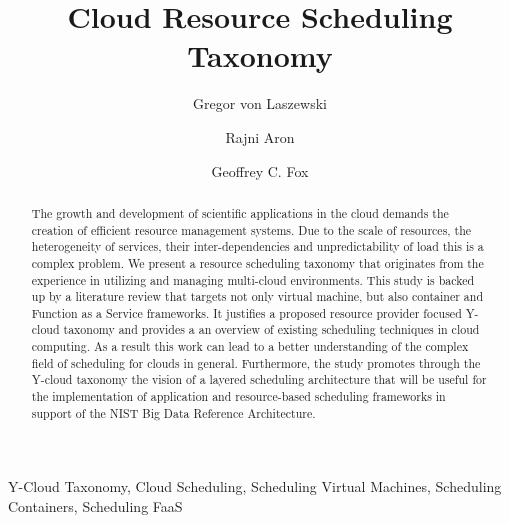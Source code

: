 \documentclass[final,5p,times,twocolumn]{elsarticle}
\author[label1]{Gregor von Laszewski\corref{cor1}\fnref{label3}}
\author[label2]{Rajni Aron}
\author[label1]{Geoffrey C. Fox}
\newcommand{\TITLE}{Cloud Resource Scheduling Taxonomy }
\begin{document}
\onecolumn







\begin{frontmatter}
\title{\TITLE}

\maketitle



\begin{keyword}

  Y-Cloud Taxonomy,
  Cloud Scheduling,
  Scheduling Virtual Machines,
  Scheduling Containers,
  Scheduling FaaS

\end{keyword}

\begin{abstract}

  The growth and development of scientific applications in the cloud
  demands the creation of efficient resource management systems. Due
  to the scale of resources, the heterogeneity of services, their
  inter-dependencies and unpredictability of load this is a complex
  problem. We present a resource scheduling taxonomy that originates
  from the experience in utilizing and managing multi-cloud
  environments.  This study is backed up by a literature review that
  targets not only virtual machine, but also container and Function as
  a Service frameworks. It justifies a proposed resource provider
  focused Y-cloud taxonomy and provides a an overview of existing
  scheduling techniques in cloud computing.  As a result this work can
  lead to a better understanding of the complex field of scheduling
  for clouds in general. Furthermore, the study promotes through the
  Y-cloud taxonomy the vision of a layered scheduling architecture
  that will be useful for the implementation of application and
  resource-based scheduling frameworks in support of the NIST Big Data
  Reference Architecture.

\end{abstract}

\end{frontmatter}
\end{document}

